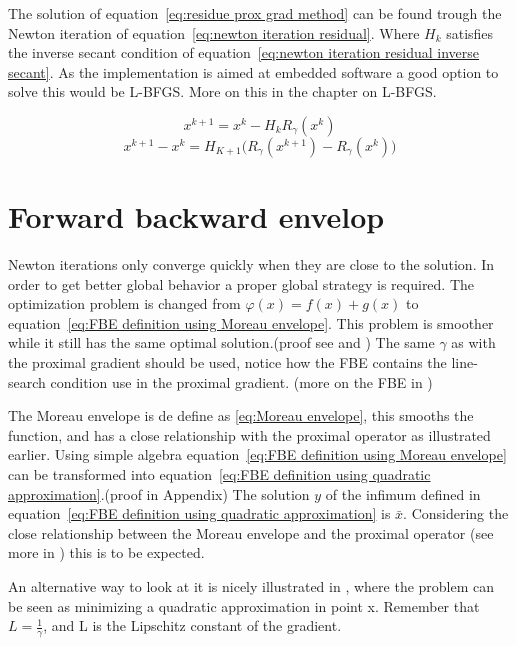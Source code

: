 			The solution of equation~\ref{eq:residue prox grad method} can be found trough the Newton iteration of equation~\ref{eq:newton iteration residual}. Where $H_k$ satisfies the inverse secant condition of equation~\ref{eq:newton iteration residual inverse secant}. As the implementation is aimed at embedded software a good option to solve this would be L-BFGS. More on this in the chapter on L-BFGS.
			
			\begin{equation}
			x^{k+1} = x^k -H_kR_{\gamma}(x^k)
			\label{eq:newton iteration residual}
			\end{equation}
			\begin{equation}
			x^{k+1} - x^k = H_{K+1} \Big( R_{\gamma}(x^{k+1})- R_{\gamma}(x^k) \Big)
			\label{eq:newton iteration residual inverse secant}
			\end{equation}
		
	\section{Forward backward envelop}	
		Newton iterations only converge quickly when they are close to the solution. In order to get better global behavior a proper global strategy is required. The optimization problem is changed from $\varphi(x) = f(x) + g(x)$ to equation~\ref{eq:FBE definition using Moreau envelope}. This problem is smoother while it still has the same optimal solution.(proof see \cite{LorenzoStella2017} and \cite{Themelis}) The same $\gamma$ as with the proximal gradient should be used, notice how the FBE contains the line-search condition use in the proximal gradient. (more on the FBE in \cite{Themelis})
		
		The Moreau envelope is de define as \ref{eq:Moreau envelope}, this smooths the function, and has a close relationship with the proximal operator as illustrated earlier. Using simple algebra equation~\ref{eq:FBE definition using Moreau envelope} can be transformed into equation~\ref{eq:FBE definition using quadratic approximation}.(proof in Appendix) The solution $y$ of the infimum defined in equation~\ref{eq:FBE definition using quadratic approximation} is $\bar{x}$. Considering the close relationship between the Moreau envelope and the proximal operator (see more in \cite{Themelis}) this is to be expected.
		
		An alternative way to look at it is nicely illustrated in \cite{AjaySathya2017}, where the problem can be seen as minimizing a quadratic approximation in point x.  Remember that $L = \frac{1}{\gamma}$, and L is the Lipschitz constant of the gradient.
		
